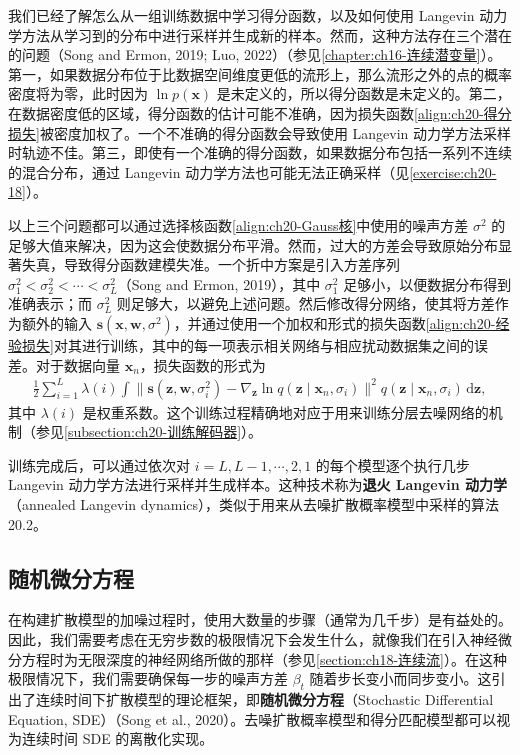 \documentclass[../../main.tex]{subfiles}
\begin{document}
我们已经了解怎么从一组训练数据中学习得分函数，以及如何使用 Langevin 动力学方法从学习到的分布中进行采样并生成新的样本。然而，这种方法存在三个潜在的问题（Song and Ermon, 2019; Luo, 2022）（参见\cref{chapter:ch16-连续潜变量}）。第一，如果数据分布位于比数据空间维度更低的流形上，那么流形之外的点的概率密度将为零，此时因为 $\ln p(\bm{x})$ 是未定义的，所以得分函数是未定义的。第二，在数据密度低的区域，得分函数的估计可能不准确，因为损失函数\eqref{align:ch20-得分损失}被密度加权了。一个不准确的得分函数会导致使用 Langevin 动力学方法采样时轨迹不佳。第三，即使有一个准确的得分函数，如果数据分布包括一系列不连续的混合分布，通过 Langevin 动力学方法也可能无法正确采样（见\cref{exercise:ch20-18}）。

以上三个问题都可以通过选择核函数\eqref{align:ch20-Gauss核}中使用的噪声方差 $\sigma^2$ 的足够大值来解决，因为这会使数据分布平滑。然而，过大的方差会导致原始分布显著失真，导致得分函数建模失准。一个折中方案是引入方差序列 $\sigma_1^2<\sigma_2^2<\cdots<\sigma_L^2$（Song and Ermon, 2019），其中 $\sigma_1^2$ 足够小，以便数据分布得到准确表示；而 $\sigma_L^2$ 则足够大，以避免上述问题。然后修改得分网络，使其将方差作为额外的输入 $\bm{s}(\bm{x},\bm{w},\sigma^2)$，并通过使用一个加权和形式的损失函数\eqref{align:ch20-经验损失}对其进行训练，其中的每一项表示相关网络与相应扰动数据集之间的误差。对于数据向量 $\bm{x}_n$，损失函数的形式为
\begin{align}
\frac{1}{2}\sum_{i=1}^{L}\lambda(i)\int\big\|\bm{s}(\bm{z},\bm{w},\sigma_i^2)-\nabla_{\bm{z}}\ln q(\bm{z}\mid\bm{x}_n,\sigma_i)\big\|^2q(\bm{z}\mid\bm{x}_n,\sigma_i)\,\mathrm{d}\bm{z},
\label{align:ch20-退火损失}
\end{align}
其中 $\lambda(i)$ 是权重系数。这个训练过程精确地对应于用来训练分层去噪网络的机制（参见\cref{subsection:ch20-训练解码器}）。

训练完成后，可以通过依次对 $i=L,L-1,\cdots,2,1$ 的每个模型逐个执行几步 Langevin 动力学方法进行采样并生成样本。这种技术称为\textbf{退火 Langevin 动力学}（annealed Langevin dynamics），类似于用来从去噪扩散概率模型中采样的算法 20.2。

\subsection{随机微分方程}\label{subsection:ch20-随机微分方程}

在构建扩散模型的加噪过程时，使用大数量的步骤（通常为几千步）是有益处的。因此，我们需要考虑在无穷步数的极限情况下会发生什么，就像我们在引入神经微分方程时为无限深度的神经网络所做的那样（参见\cref{section:ch18-连续流}）。在这种极限情况下，我们需要确保每一步的噪声方差 $\beta_t$ 随着步长变小而同步变小。这引出了连续时间下扩散模型的理论框架，即\textbf{随机微分方程}（Stochastic Differential Equation, SDE）（Song et al., 2020）。去噪扩散概率模型和得分匹配模型都可以视为连续时间 SDE 的离散化实现。
\end{document}
